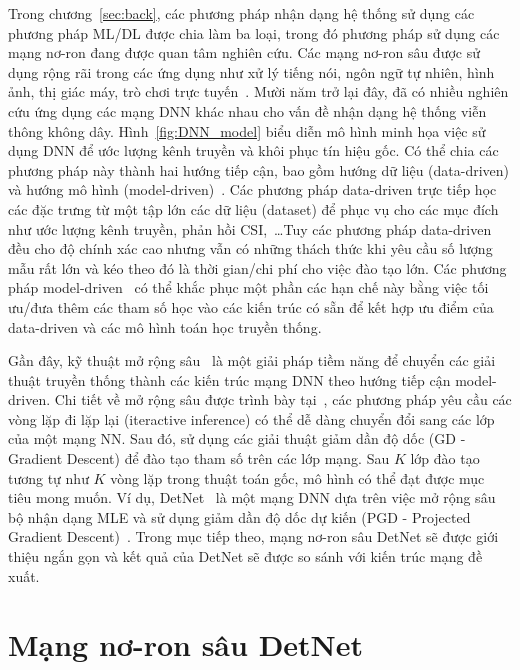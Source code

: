 Trong chương~\ref{sec:back}, các phương pháp nhận dạng hệ thống sử dụng các phương pháp ML/DL được chia làm ba loại, trong đó phương pháp sử dụng các mạng nơ-ron đang được quan tâm nghiên cứu. Các mạng nơ-ron sâu được sử dụng rộng rãi trong các ứng dụng như xử lý tiếng nói, ngôn ngữ tự nhiên, hình ảnh, thị giác máy, trò chơi trực tuyến~\cite{Samek2021}. Mười năm trở lại đây, đã có nhiều nghiên cứu ứng dụng các mạng DNN khác nhau cho vấn đề nhận dạng hệ thống viễn thông không dây. Hình~\ref{fig:DNN_model} biểu diễn mô hình minh họa việc sử dụng DNN để ước lượng kênh truyền và khôi phục tín hiệu gốc. Có thể chia các phương pháp này thành hai hướng tiếp cận, bao gồm hướng dữ liệu (data-driven) và hướng mô hình (model-driven)~\cite{Liao2020}. Các phương pháp data-driven trực tiếp học các đặc trưng từ một tập lớn các dữ liệu (dataset) để phục vụ cho các mục đích như ước lượng kênh truyền, phản hồi CSI,~\ldots Tuy các phương pháp data-driven đều cho độ chính xác cao nhưng vẫn có những thách thức khi yêu cầu số lượng mẫu rất lớn và kéo theo đó là thời gian/chi phí cho việc đào tạo lớn. Các phương pháp model-driven~\cite{He2019} có thể khắc phục một phần các hạn chế này bằng việc tối ưu/đưa thêm các tham số học vào các kiến trúc có sẵn để kết hợp ưu điểm của data-driven và các mô hình toán học truyền thống. 

Gần đây, kỹ thuật mở rộng sâu~\cite{Wisdom2016} là một giải pháp tiềm năng để chuyển các giải thuật truyền thống thành các kiến trúc mạng DNN theo hướng tiếp cận model-driven. Chi tiết về mở rộng sâu được trình bày tại~\cite{John2014}, các phương pháp yêu cầu các vòng lặp đi lặp lại (iteractive inference) có thể dễ dàng chuyển đổi sang các lớp của một mạng NN. Sau đó, sử dụng các giải thuật giảm dần độ dốc (GD - Gradient Descent) để đào tạo tham số trên các lớp mạng. Sau $K$ lớp đào tạo tương tự như $K$ vòng lặp trong thuật toán gốc, mô hình có thể đạt được mục tiêu mong muốn. Ví dụ, DetNet~\cite{Samuel2017} là một mạng DNN dựa trên việc mở rộng sâu bộ nhận dạng MLE và sử dụng giảm dần độ dốc dự kiến (PGD - Projected Gradient Descent)~\cite{Chen2015}. Trong mục tiếp theo, mạng nơ-ron sâu DetNet sẽ được giới thiệu ngắn gọn và kết quả của DetNet sẽ được so sánh với kiến trúc mạng đề xuất.

\section{Mạng nơ-ron sâu DetNet}

